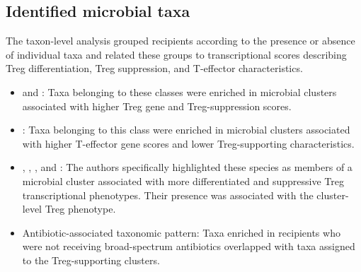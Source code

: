 \documentclass[11pt,a4paper]{article}
\begin{document}
\subsection{Identified microbial taxa}

The taxon-level analysis grouped recipients according to the presence or absence of individual taxa and related these groups to transcriptional scores describing Treg differentiation, Treg suppression, and T-effector characteristics. 

\begin{itemize}

\item \taxClostridia and \taxBacteroidia: Taxa belonging to these classes were enriched in microbial clusters associated with higher Treg gene and Treg-suppression scores. 

\item \taxGammaproteobacteria: Taxa belonging to this class were enriched in microbial clusters associated with higher T-effector gene scores and lower Treg-supporting characteristics.

\item \taxStreptococcusSalivarius, \taxFaecalibacteriumPrausnitzii, \taxBlautiaWexlerae, and \taxBacteroidesOvatus: The authors specifically highlighted these species as members of a microbial cluster associated with more differentiated and suppressive Treg transcriptional phenotypes. Their presence was associated with the cluster-level Treg phenotype.

\item Antibiotic-associated taxonomic pattern: Taxa enriched in recipients who were not receiving broad-spectrum antibiotics overlapped with taxa assigned to the Treg-supporting clusters. 

\end{itemize}
\end{document}
